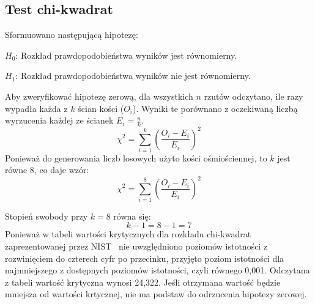\subsection{Test chi-kwadrat}
Sformuowano następującą hipotezę:
\par \begin{math} H_0 \end{math}: Rozkład prawdopodobieństwa wyników jest równomierny.
\par \begin{math} H_1 \end{math}: Rozkład prawdopodobieństwa wyników nie jest równomierny.
\par Aby zweryfikować hipotezę zerową, dla wszystkich \begin{math} n \end{math} rzutów odczytano, ile razy wypadła każda z 
\begin{math} k \end{math} ścian kości (\begin{math}O_i\end{math}). Wyniki te porównano z oczekiwaną
liczbą wyrzucenia każdej ze ścianek \begin{math}E_i = \frac{n}{k}\end{math}. 
\begin{displaymath}
    \chi^2 = \sum_{i=1}^{k} \left( \frac{O_i - E_i}{E_i} \right)^2
\end{displaymath}
Ponieważ do generowania liczb losowych użyto kości ośmiościennej, to \begin{math} k \end{math} jest równe 8, co daje wzór:
\begin{displaymath}
    \chi^2 = \sum^{8}_{i=1} \left( \frac{O_i - E_i}{E_i} \right)^2
\end{displaymath}
\par Stopień swobody przy \begin{math} k = 8 \end{math} równa się:
\begin{displaymath}
    k - 1 = 8 - 1 = 7
\end{displaymath}
Ponieważ w tabeli wartości krytycznych dla rozkładu chi-kwadrat zaprezentowanej przez NIST~\cite{NIST2012} nie
uwzględniono poziomów istotności z rozwinięciem do czterech cyfr po przecinku, przyjęto poziom istotności dla 
najmniejszego z dostępnych poziomów istotności, czyli równego 0{,}001. Odczytana z tabeli wartość krytyczna wynosi
24{,}322. Jeśli otrzymana wartość będzie mniejsza od wartości krtycznej, nie ma podstaw do odrzucenia 
hipotezy zerowej.


